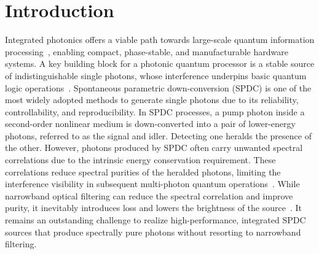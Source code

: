 \documentclass[aps, amsmath, amssymb,reprint,superscriptaddress]{revtex4-2}
\begin{document}
\maketitle

\section{Introduction}

Integrated photonics offers a viable path towards large-scale quantum information processing~\cite{madsen2022quantum,flamini2018photonic,multiphoton,psiquantum2025}, enabling compact, phase-stable, and manufacturable hardware systems. A key building block for a photonic quantum processor is a stable source of indistinguishable single photons\cite{HOM1987}, whose interference underpins basic quantum logic operations~\cite{2019photonic,kok2007linear,zhong2020quantum}. Spontaneous parametric down-conversion (SPDC) is one of the most widely adopted methods to generate single photons due to its reliability, controllability, and reproducibility. In SPDC processes, a pump photon inside a second-order nonlinear medium is down-converted into a pair of lower-energy photons, referred to as the signal and idler. Detecting one heralds the presence of the other\cite{2008PRLwal,2017PRLheralded}. However, photons produced by SPDC often carry unwanted spectral correlations due to the intrinsic energy conservation requirement. These correlations reduce spectral purities of the heralded photons, limiting the interference visibility in subsequent multi-photon quantum operations~\cite{2001PRAeliminating}. While narrowband optical filtering can reduce the spectral correlation and improve purity, it inevitably introduces loss and lowers the brightness of the source~\cite{2017PRALimits}. It remains an outstanding challenge to realize high-performance, integrated SPDC sources that produce spectrally pure photons without resorting to narrowband filtering.
\end{document}
